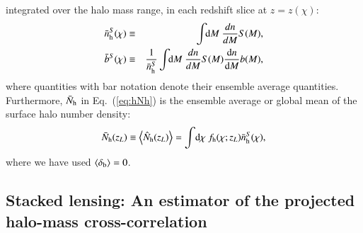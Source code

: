\documentclass[onecolumn,notitlepage,showpacs,amsmath,amssymb,prd,floatfix]{revtex4-1}
\def\ave#1{\left\langle #1 \right\rangle}
\newcommand{\bx}{{\bf x}}
\newcommand{\dr}{\mathrm{d}}
\newcommand{\deltab}{\delta_{\rm b}}
\newcommand{\deltaml}{\delta_{\mathrm{m,lin}}}
\newcommand{\bh}{\mathrm{h}}
\newcommand{\bnh}{\frac{\dr n}{\dr M}}
\newcommand{\bnhs}{\bar{n}_{\rm h}^S}
\newcommand{\hNh}{\hat{N}_{\rm h}}
\newcommand{\bNh}{\bar{N}_{\rm h}}
\begin{document}
integrated over the halo mass range, in each redshift slice at
$z=z(\chi)$:
%
\begin{eqnarray}
 \bnhs(\chi) &\equiv & \int\!\!\dr M~ \frac{dn}{dM}S(M), \nonumber\\
 \bar{b}^S(\chi)&\equiv & \frac{1}{\bnhs}\int\!\!\dr M~
  \frac{dn}{dM}S(M)\bnh b(M), 
\label{eq:aveb}
\end{eqnarray}
%
where quantities with bar notation denote their ensemble average
quantities.  Furthermore, $\bNh$ in Eq.~(\ref{eq:hNh}) is the ensemble
average or global mean of the surface halo number density:
%
\begin{equation}
 \bNh(z_L)\equiv 
  \ave{\hNh(z_L)}=\int\!\dr\chi~f_\bh(\chi;z_L)\bnhs(\chi),
\end{equation}
%
where we have used $\ave{\deltab}=0$.  






\subsection{Stacked lensing: An estimator of the projected halo-mass cross-correlation}
\end{document}
